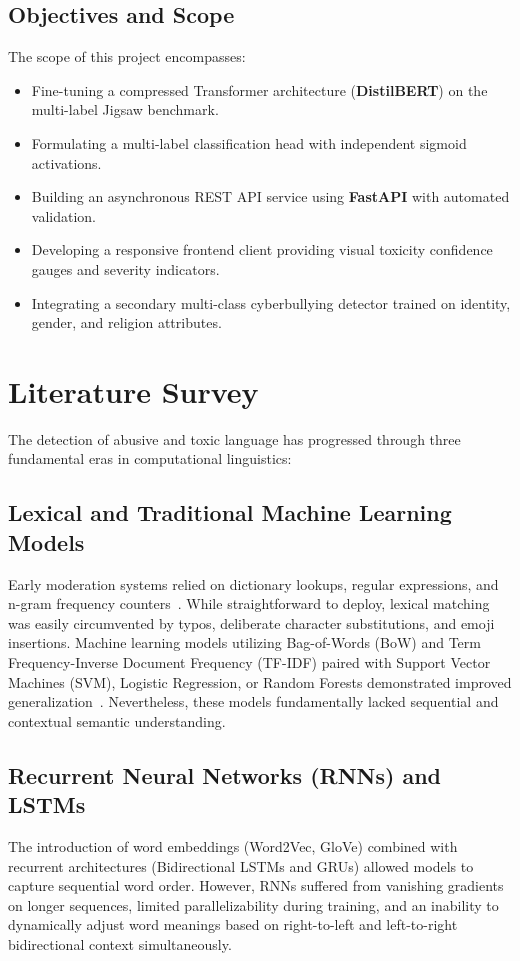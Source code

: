 \documentclass[12pt,a4paper]{article}
\begin{document}
\subsection{Objectives and Scope}
The scope of this project encompasses:
\begin{itemize}
    \item Fine-tuning a compressed Transformer architecture (\textbf{DistilBERT}) on the multi-label Jigsaw benchmark.
    \item Formulating a multi-label classification head with independent sigmoid activations.
    \item Building an asynchronous REST API service using \textbf{FastAPI} with automated validation.
    \item Developing a responsive frontend client providing visual toxicity confidence gauges and severity indicators.
    \item Integrating a secondary multi-class cyberbullying detector trained on identity, gender, and religion attributes.
\end{itemize}

\section{Literature Survey}
The detection of abusive and toxic language has progressed through three fundamental eras in computational linguistics:

\subsection{Lexical and Traditional Machine Learning Models}
Early moderation systems relied on dictionary lookups, regular expressions, and n-gram frequency counters~\cite{wulczyn2017ex}. While straightforward to deploy, lexical matching was easily circumvented by typos, deliberate character substitutions, and emoji insertions. Machine learning models utilizing Bag-of-Words (BoW) and Term Frequency-Inverse Document Frequency (TF-IDF) paired with Support Vector Machines (SVM), Logistic Regression, or Random Forests demonstrated improved generalization~\cite{davidson2017automated, fortuna2018survey}. Nevertheless, these models fundamentally lacked sequential and contextual semantic understanding.

\subsection{Recurrent Neural Networks (RNNs) and LSTMs}
The introduction of word embeddings (Word2Vec, GloVe) combined with recurrent architectures (Bidirectional LSTMs and GRUs) allowed models to capture sequential word order. However, RNNs suffered from vanishing gradients on longer sequences, limited parallelizability during training, and an inability to dynamically adjust word meanings based on right-to-left and left-to-right bidirectional context simultaneously.
\end{document}
